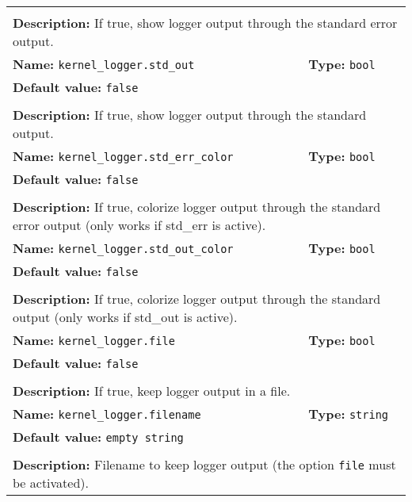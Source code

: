 \begin{center}
\begin{tabular}{|p{7.5cm}|p{7.5cm}|}
	\multicolumn{2}{|l|}{}\\
	\multicolumn{2}{|p{15cm}|}{\textbf{Description:} \newline If true, show logger output through the standard error output.}\\
	\hline
	\multicolumn{1}{|p{7.5cm}}{\textbf{Name:} \texttt{kernel\_logger.std\_out}} & \multicolumn{1}{p{7.5cm}|}{\textbf{Type:} \texttt{bool}}\\
	\multicolumn{2}{|p{15cm}|}{\textbf{Default value:} \texttt{false}}\\
	\multicolumn{2}{|l|}{}\\
	\multicolumn{2}{|p{15cm}|}{\textbf{Description:} \newline If true, show logger output through the standard output.}\\
	\hline
	\multicolumn{1}{|p{7.5cm}}{\textbf{Name:} \texttt{kernel\_logger.std\_err\_color}} & \multicolumn{1}{p{7.5cm}|}{\textbf{Type:} \texttt{bool}}\\
	\multicolumn{2}{|p{15cm}|}{\textbf{Default value:} \texttt{false}}\\
	\multicolumn{2}{|l|}{}\\
	\multicolumn{2}{|p{15cm}|}{\textbf{Description:} \newline If true, colorize logger output through the standard error output (only works if std\_err is active).}\\
	\hline
	\multicolumn{1}{|p{7.5cm}}{\textbf{Name:} \texttt{kernel\_logger.std\_out\_color}} & \multicolumn{1}{p{7.5cm}|}{\textbf{Type:} \texttt{bool}}\\
	\multicolumn{2}{|p{15cm}|}{\textbf{Default value:} \texttt{false}}\\
	\multicolumn{2}{|l|}{}\\
	\multicolumn{2}{|p{15cm}|}{\textbf{Description:} \newline If true, colorize logger output through the standard output (only works if std\_out is active).}\\
	\hline
	\multicolumn{1}{|p{7.5cm}}{\textbf{Name:} \texttt{kernel\_logger.file}} & \multicolumn{1}{p{7.5cm}|}{\textbf{Type:} \texttt{bool}}\\
	\multicolumn{2}{|p{15cm}|}{\textbf{Default value:} \texttt{false}}\\
	\multicolumn{2}{|l|}{}\\
	\multicolumn{2}{|p{15cm}|}{\textbf{Description:} \newline If true, keep logger output in a file.}\\
	\hline
	\multicolumn{1}{|p{7.5cm}}{\textbf{Name:} \texttt{kernel\_logger.filename}} & \multicolumn{1}{p{7.5cm}|}{\textbf{Type:} \texttt{string}}\\
	\multicolumn{2}{|p{15cm}|}{\textbf{Default value:} \texttt{empty string}}\\
	\multicolumn{2}{|l|}{}\\
	\multicolumn{2}{|p{15cm}|}{\textbf{Description:} \newline Filename to keep logger output (the option \texttt{file} must be activated).}\\
	\hline
	\end{tabular}
\end{center}

